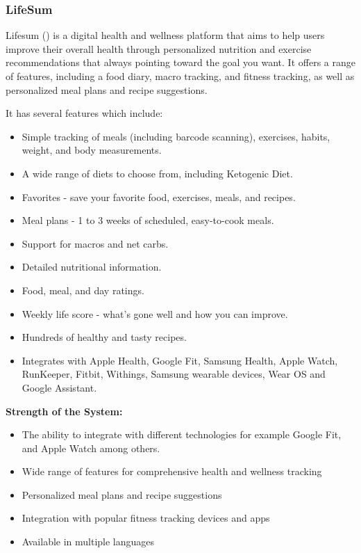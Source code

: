 \documentclass{article}
\begin{document}
\subsubsection{LifeSum}

Lifesum (\cite{lifesum}) is a digital health and wellness platform that aims to help users improve their overall health through personalized nutrition and exercise recommendations that always pointing toward the goal you want. It offers a range of features, including a food diary, macro tracking, and fitness tracking, as well as personalized meal plans and recipe suggestions.

It has several features which include:
\begin{itemize}
\item Simple tracking of meals (including barcode scanning), exercises, habits, weight, and body measurements.
\item A wide range of diets to choose from, including Ketogenic Diet.
\item Favorites - save your favorite food, exercises, meals, and recipes.
\item Meal plans - 1 to 3 weeks of  scheduled, easy-to-cook meals.
\item Support for macros and net carbs.
\item Detailed nutritional information.
\item Food, meal, and day ratings.
\item Weekly life score - what's gone well and how you can improve.
\item Hundreds of healthy and tasty recipes.
\item Integrates with Apple Health, Google Fit, Samsung Health, Apple Watch, RunKeeper, Fitbit, Withings, Samsung wearable devices, Wear OS and Google Assistant.
\end{itemize}

\textbf{Strength of the System:}
\begin{itemize}
\item The ability to integrate with different technologies for example Google Fit, and Apple Watch among others.
\item Wide range of features for comprehensive health and wellness tracking
\item Personalized meal plans and recipe suggestions
\item Integration with popular fitness tracking devices and apps
\item Available in multiple languages
\end{itemize}
\end{document}
